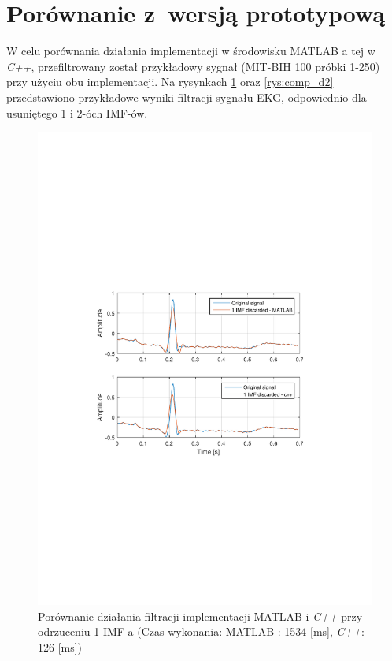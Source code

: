 \section{Porównanie z~wersją prototypową}
\indent

W celu porównania działania implementacji w środowisku \textrm{MATLAB} a tej w
\textit{C++}, przefiltrowany został przykładowy sygnał (MIT-BIH 100 próbki
1-250) przy użyciu obu implementacji. Na rysynkach \ref{rys:comp_d1} oraz
\ref{rys:comp_d2} przedstawiono przykładowe wyniki filtracji sygnału EKG,
odpowiednio dla usuniętego 1 i 2-óch IMF-ów.

\begin{figure}[!htb]
    \begin{center}
        \includegraphics[width=14cm,trim=3cm 9cm 4cm 9cm,clip]
        {../img/mat_cpp_domp_d1.pdf}
    \end{center}
    \caption{Porównanie działania filtracji implementacji \textrm{MATLAB} i
    \textit{C++} przy odrzuceniu 1 IMF-a (Czas wykonania: \textrm{MATLAB} : 1534
    [ms], \textit{C++}: 126 [ms])}
    \label{rys:comp_d1}
\end{figure}

